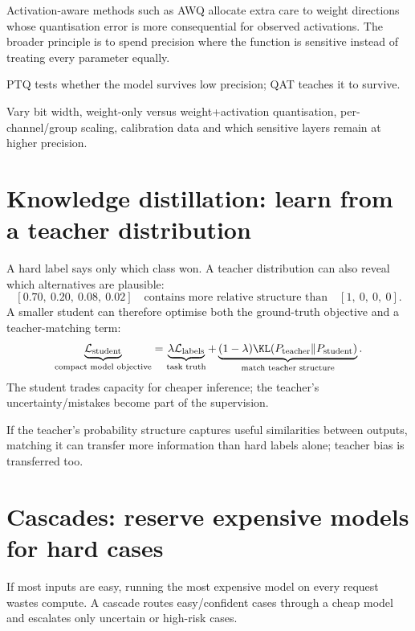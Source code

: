 Activation-aware methods such as AWQ allocate extra care to weight directions whose quantisation error is more consequential for observed activations.
The broader principle is to spend precision where the function is sensitive instead of treating every parameter equally.

\begin{calloutmemoryhook}
PTQ tests whether the model survives low precision; QAT teaches it to survive.
\end{calloutmemoryhook}

\begin{calloutdegreeofexperiment}
Vary bit width, weight-only versus weight+activation quantisation, per-channel/group scaling, calibration data and which sensitive layers remain at higher precision.
\end{calloutdegreeofexperiment}

\section{Knowledge distillation: learn from a teacher distribution}
\label{sec:inference-distillation}
A hard label says only which class won.
A teacher distribution can also reveal which alternatives are plausible:
\[
[0.70,\ 0.20,\ 0.08,\ 0.02]
\quad\text{contains more relative structure than}\quad
[1,\ 0,\ 0,\ 0].
\]
A smaller student can therefore optimise both the ground-truth objective and a teacher-matching term:
\[
\underbrace{\mathcal L_{\text{student}}}_{\text{compact model objective}}
=
\underbrace{\lambda\mathcal L_{\text{labels}}}_{\text{task truth}}
+
\underbrace{(1-\lambda)\KL(P_{\text{teacher}}\|P_{\text{student}})}_{\text{match teacher structure}}.
\]
The student trades capacity for cheaper inference; the teacher's uncertainty/mistakes become part of the supervision.

\begin{calloutbias}
If the teacher's probability structure captures useful similarities between outputs, matching it can transfer more information than hard labels alone; teacher bias is transferred too.
\end{calloutbias}

\section{Cascades: reserve expensive models for hard cases}
\label{sec:inference-cascades}
If most inputs are easy, running the most expensive model on every request wastes compute.
A cascade routes easy/confident cases through a cheap model and escalates only uncertain or high-risk cases.

